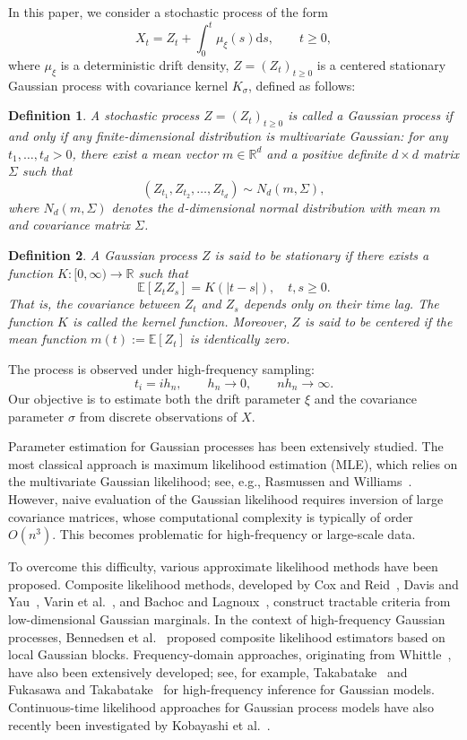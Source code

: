 \documentclass[a4paper,10pt,twoside]{article}
\newtheorem{defn}{Definition}[section]
\numberwithin{equation}{section}
\def\E{\mathbb{E}}
\begin{document}
In this paper, we consider a stochastic process of the form
\[
X_t = Z_t + \int_0^t \mu_\xi(s)\mathrm{d}s,
\qquad t \ge 0,
\]
where $\mu_\xi$ is a deterministic drift density, $Z=(Z_t)_{t\ge0}$ is a centered stationary Gaussian process
with covariance kernel $K_\sigma$, defined as follows: 

\begin{defn}
A stochastic process $Z = (Z_t)_{t \ge 0}$ is called a \textit{Gaussian process} if and only if any finite-dimensional distribution is multivariate Gaussian: for any $t_1,\dots,t_d > 0$, there exist a mean vector $m \in \mathbb{R}^d$ and a positive definite $d \times d$ matrix $\Sigma$ such that
\[
(Z_{t_1}, Z_{t_2}, \dots, Z_{t_d}) \sim N_d(m, \Sigma),
\]
where $N_d(m, \Sigma)$ denotes the $d$-dimensional normal distribution with mean $m$ and covariance matrix $\Sigma$.
\end{defn}

\begin{defn}
A Gaussian process $Z$ is said to be \textit{stationary} if there exists a function $K:[0,\infty) \to \mathbb{R}$ such that
\[
\E[Z_t Z_s] = K(|t - s|), \quad t, s \ge 0.
\]
That is, the covariance between $Z_t$ and $Z_s$ depends only on their time lag. The function $K$ is called the \textit{kernel function}. Moreover, $Z$ is said to be \textit{centered} if the mean function $m(t) := \E[Z_t]$ is identically zero.
\end{defn}


The process is observed under high-frequency sampling:
\[
t_i = ih_n,
\qquad
h_n \to 0,
\qquad
nh_n \to \infty.
\]
Our objective is to estimate both the drift parameter $\xi$ and the covariance parameter $\sigma$ from discrete observations of $X$.

Parameter estimation for Gaussian processes has been extensively studied.
The most classical approach is maximum likelihood estimation (MLE), which relies on the multivariate Gaussian likelihood; see, e.g., Rasmussen and Williams~\cite{rw06}.
However, naive evaluation of the Gaussian likelihood requires inversion of large covariance matrices, whose computational complexity is typically of order $O(n^3)$.
This becomes problematic for high-frequency or large-scale data.

To overcome this difficulty, various approximate likelihood methods have been proposed.
Composite likelihood methods, developed by Cox and Reid~\cite{cr04}, Davis and Yau~\cite{dy11}, Varin et al.~\cite{vetal11}, and Bachoc and Lagnoux~\cite{bl20}, construct tractable criteria from low-dimensional Gaussian marginals.
In the context of high-frequency Gaussian processes, Bennedsen et al.~\cite{betal24} proposed composite likelihood estimators based on local Gaussian blocks.
Frequency-domain approaches, originating from Whittle~\cite{w51}, have also been extensively developed; see, for example, Takabatake~\cite{t22} and Fukasawa and Takabatake~\cite{ft16} for high-frequency inference for Gaussian models.
Continuous-time likelihood approaches for Gaussian process models have also recently been investigated by Kobayashi et al.~\cite{ketal25}.
\end{document}
